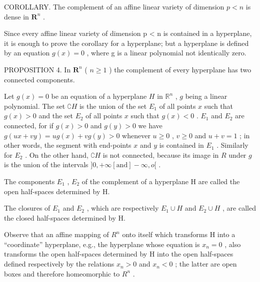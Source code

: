 COROLLARY. The complement of an affine linear variety of dimension \(p < n\) is dense in \(\mathbf{R}^n\) .

Since every affine linear variety of dimension p \textless{} n is contained in a hyperplane, it is enough to prove the corollary for a hyperplane; but a hyperplane is defined by an equation \(g(x) = 0\) , where g is a linear polynomial not identically zero.

PROPOSITION 4. In \(\mathbf{R}^n\) ( \(n \geqslant 1\) ) the complement of every hyperplane has two connected components.

Let \(g(x) = 0\) be an equation of a hyperplane \(H\) in \(\mathbb{R}^n\) , \(g\) being a linear polynomial. The set \(\complement H\) is the union of the set \(E_1\) of all points \(x\) such that \(g(x) > 0\) and the set \(E_2\) of all points \(x\) such that \(g(x) < 0\) . \(E_1\) and \(E_2\) are connected, for if \(g(x) > 0\) and \(g(y) > 0\) we have \(g(ux + vy) = ug(x) + vg(y) > 0\) whenever \(u \geqslant 0\) , \(v \geqslant 0\) and \(u + v = 1\) ; in other words, the segment with end-points \(x\) and \(y\) is contained in \(E_1\) . Similarly for \(E_2\) . On the other hand, \(\complement H\) is not connected, because its image in \(R\) under \(g\) is the union of the intervals \(]0, +\infty[ \text{and}] - \infty, o[\) .

The components \(E_{1}\) , \(E_{2}\) of the complement of a hyperplane H are called the open half-spaces determined by H.

The closures of \(E_{1}\) and \(E_{2}\) , which are respectively \(E_{1} \cup H\) and \(E_{2} \cup H\) , are called the closed half-spaces determined by H.

Observe that an affine mapping of \(R^{n}\) onto itself which transforms H into a ``coordinate'' hyperplane, e.g., the hyperplane whose equation is \(x_{n}=0\) , also transforms the open half-spaces determined by H into the open half-spaces defined respectively by the relations \(x_{n}>0\) and \(x_{n}<0\) ; the latter are open boxes and therefore homeomorphic to \(R^{n}\) .

